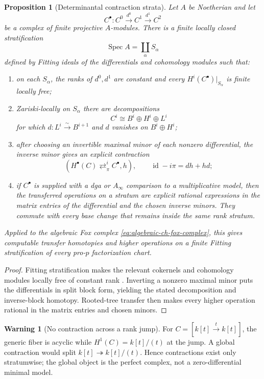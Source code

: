 \documentclass[11pt]{article}
\newtheorem{proposition}[theorem]{Proposition}
\theoremstyle{definition}
\newtheorem{warning}[theorem]{Warning}
\begin{document}
\begin{proposition}[Determinantal contraction strata]\label{prop:determinantal-contraction}
Let $A$ be Noetherian and let
\[
 C^\bullet:
 C^0\xrightarrow{d^0}C^1\xrightarrow{d^1}C^2
\]
be a complex of finite projective $A$-modules.  There is a finite locally closed stratification
\[
 \operatorname{Spec}A
 =
 \coprod_{\alpha}S_{\alpha}
\]
defined by Fitting ideals of the differentials and cohomology modules such that:
\begin{enumerate}[label=\textnormal{(\roman*)}]
\item on each $S_{\alpha}$, the ranks of $d^0,d^1$ are constant and every $H^i(C^\bullet)|_{S_{\alpha}}$ is finite locally free;
\item Zariski-locally on $S_{\alpha}$ there are decompositions
\[
 C^i
 \cong
 B^i\oplus H^i\oplus L^i
\]
for which $d:L^i\xrightarrow{\sim}B^{i+1}$ and $d$ vanishes on $B^i\oplus H^i$;
\item after choosing an invertible maximal minor of each nonzero differential, the inverse minor gives an explicit contraction
\[
 \left(
 H^\bullet(C)
 \mathop{\rightleftarrows}^{i}_{\pi}
 C^\bullet,
 h
 \right),
 \qquad
 \operatorname{id}-i\pi=dh+hd;
\]
\item if $C^\bullet$ is supplied with a dga or $A_\infty$ comparison to a multiplicative model, then the transferred operations on a stratum are explicit rational expressions in the matrix entries of the differential and the chosen inverse minors.  They commute with every base change that remains inside the same rank stratum.
\end{enumerate}
Applied to the algebraic Fox complex \eqref{eq:algebraic-ch-fox-complex}, this gives computable transfer homotopies and higher operations on a finite Fitting stratification of every pro-$p$ factorization chart.
\end{proposition}

\begin{proof}
Fitting stratification makes the relevant cokernels and cohomology modules locally free of constant rank \cite{StacksFitting}.  Inverting a nonzero maximal minor puts the differentials in split block form, yielding the stated decomposition and inverse-block homotopy.  Rooted-tree transfer then makes every higher operation rational in the matrix entries and chosen minors.
\end{proof}

\begin{warning}[No contraction across a rank jump]\label{warn:no-global-rank-jump-contraction}
For $C=[k[t]\xrightarrow{t}k[t]]$, the generic fiber is acyclic while $H^1(C)=k[t]/(t)$ at the jump.  A global contraction would split $k[t]\twoheadrightarrow k[t]/(t)$.  Hence contractions exist only stratumwise; the global object is the perfect complex, not a zero-differential minimal model.
\end{warning}
\end{document}
